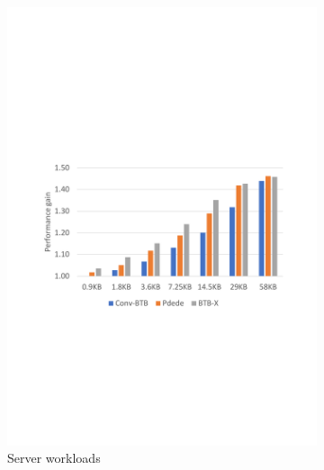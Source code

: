 \begin{figure}
    \centering
    \begin{subfigure}[t]{0.935\columnwidth}
        \centering
        \includegraphics[width=0.935\columnwidth, trim=70 235 60 250, clip]{figures/ISOStorage_server_revised.pdf}
        \caption{Server workloads}
        \label{hpca:fig:serverPerf}
    \end{subfigure}
    ~ %
    \begin{subfigure}[t]{0.935\columnwidth}
        \centering

\end{subfigure}
\end{figure}
